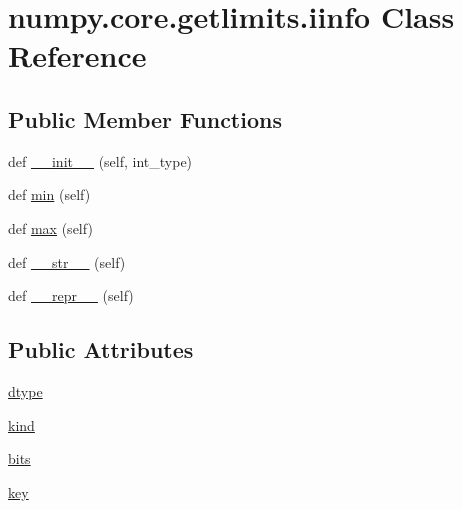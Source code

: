 \hypertarget{classnumpy_1_1core_1_1getlimits_1_1iinfo}{}\section{numpy.\+core.\+getlimits.\+iinfo Class Reference}
\label{classnumpy_1_1core_1_1getlimits_1_1iinfo}
\subsection*{Public Member Functions}
\begin{DoxyCompactItemize}
\item 
def \hyperlink{classnumpy_1_1core_1_1getlimits_1_1iinfo_aecf906846c23c1b96d98b4dc3365fabd}{\+\_\+\+\_\+init\+\_\+\+\_\+} (self, int\+\_\+type)
\item 
def \hyperlink{classnumpy_1_1core_1_1getlimits_1_1iinfo_afa2f5e0124f4841450c7019bd1869fe0}{min} (self)
\item 
def \hyperlink{classnumpy_1_1core_1_1getlimits_1_1iinfo_a02c36ed1cc640643fc79dad11fa5b532}{max} (self)
\item 
def \hyperlink{classnumpy_1_1core_1_1getlimits_1_1iinfo_ae6f18967b82e0c780bb8dd19bc98650b}{\+\_\+\+\_\+str\+\_\+\+\_\+} (self)
\item 
def \hyperlink{classnumpy_1_1core_1_1getlimits_1_1iinfo_a09fd9b674705150d1ce63d99eb39f1ac}{\+\_\+\+\_\+repr\+\_\+\+\_\+} (self)
\end{DoxyCompactItemize}
\subsection*{Public Attributes}
\begin{DoxyCompactItemize}
\item 
\hyperlink{classnumpy_1_1core_1_1getlimits_1_1iinfo_a386adb0300747f4a3b1e42fde79ecb85}{dtype}
\item 
\hyperlink{classnumpy_1_1core_1_1getlimits_1_1iinfo_ad17a169a1fd1277e24c4781f7418f986}{kind}
\item 
\hyperlink{classnumpy_1_1core_1_1getlimits_1_1iinfo_a4f76b0fb48222a963949ce72b96a0863}{bits}
\item 
\hyperlink{classnumpy_1_1core_1_1getlimits_1_1iinfo_a5513961438841c04d7e8330b9a9edbd0}{key}
\end{DoxyCompactItemize}


